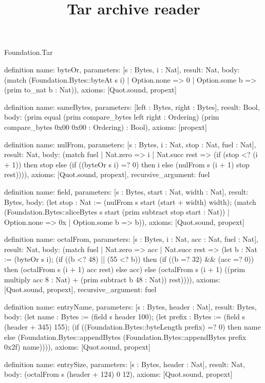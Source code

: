 \begin{lexlean}{Foundation.Tar}
\title{Tar archive reader}
\begin{semanticmodule}
definition{
  name: byteOr,
  parameters: [s : Bytes, i : Nat],
  result: Nat,
  body: (match (Foundation.Bytes::byteAt s i)
    | Option.none => 0
    | Option.some b => (prim to_nat b : Nat)),
  axioms: [Quot.sound, propext]
}

definition{
  name: sameBytes,
  parameters: [left : Bytes, right : Bytes],
  result: Bool,
  body: (prim equal (prim compare_bytes left right : Ordering) (prim compare_bytes 0x00 0x00 : Ordering) : Bool),
  axioms: [propext]
}

definition{
  name: nulFrom,
  parameters: [s : Bytes, i : Nat, stop : Nat, fuel : Nat],
  result: Nat,
  body: (match fuel
    | Nat.zero => i
    | Nat.succ rest => (if (stop <? (i + 1)) then stop else (if ((byteOr s i) =? 0) then i else (nulFrom s (i + 1) stop rest)))),
  axioms: [Quot.sound, propext],
  recursive_argument: fuel
}

definition{
  name: field,
  parameters: [s : Bytes, start : Nat, width : Nat],
  result: Bytes,
  body: (let stop : Nat := (nulFrom s start (start + width) width); (match (Foundation.Bytes::sliceBytes s start (prim subtract stop start : Nat))
    | Option.none => 0x
    | Option.some b => b)),
  axioms: [Quot.sound, propext]
}

definition{
  name: octalFrom,
  parameters: [s : Bytes, i : Nat, acc : Nat, fuel : Nat],
  result: Nat,
  body: (match fuel
    | Nat.zero => acc
    | Nat.succ rest => (let b : Nat := (byteOr s i); (if ((b <? 48) || (55 <? b)) then (if ((b =? 32) && (acc =? 0)) then (octalFrom s (i + 1) acc rest) else acc) else (octalFrom s (i + 1) ((prim multiply acc 8 : Nat) + (prim subtract b 48 : Nat)) rest)))),
  axioms: [Quot.sound, propext],
  recursive_argument: fuel
}

definition{
  name: entryName,
  parameters: [s : Bytes, header : Nat],
  result: Bytes,
  body: (let name : Bytes := (field s header 100); (let prefix : Bytes := (field s (header + 345) 155); (if ((Foundation.Bytes::byteLength prefix) =? 0) then name else (Foundation.Bytes::appendBytes (Foundation.Bytes::appendBytes prefix 0x2f) name)))),
  axioms: [Quot.sound, propext]
}

definition{
  name: entrySize,
  parameters: [s : Bytes, header : Nat],
  result: Nat,
  body: (octalFrom s (header + 124) 0 12),
  axioms: [Quot.sound, propext]
}


\end{semanticmodule}
\end{lexlean}

